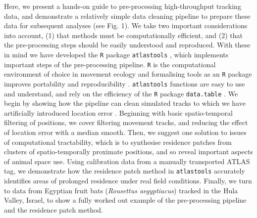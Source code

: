 \documentclass[10pt,paper=a4,headings=standardclasses
]{scrartcl}
\begin{document}
Here, we present a hands-on guide to pre-processing high-throughput tracking data, and demonstrate a relatively simple data cleaning pipeline to prepare these data for subsequent analyses (see Fig. 1). 
We take two important considerations into account, (1) that methods must be computationally efficient, and (2) that the pre-processing steps should be easily understood and reproduced.
With these in mind we have developed the \texttt{R} package \texttt{atlastools} \citep{gupte2020a, rcoreteam2020}, which implements important steps of the pre-processing pipeline.
\texttt{R} is the computational environment of choice in movement ecology \citep{joo2020} and formalising tools as an \texttt{R} package improves portability and reproducibility \citep{marwick2018}.
\texttt{atlastools} functions are easy to use and understand, and rely on the efficiency of the \texttt{R} package \texttt{data.table} \citep{dowle2020}.
We begin by showing how the pipeline can clean simulated tracks to which we have artificially introduced location error \citep{gurarie2017}.
Beginning with basic spatio-temporal filtering of positions, we cover filtering movement tracks, and reducing the effect of location error with a median smooth.
Then, we suggest one solution to issues of computational tractability, which is to synthesise residence patches \citep[\textit{sensu}][]{bijleveld2016, oudman2018, barraquand2008} from clusters of spatio-temporally proximate positions, and so reveal important aspects of animal space use.
Using calibration data from a manually transported ATLAS tag, we demonstrate how the residence patch method in \texttt{atlastools} accurately identifies areas of prolonged residence under real field conditions.
Finally, we turn to data from Egyptian fruit bats (\textit{Rousettus aegyptiacus}) tracked in the Hula Valley, Israel, to show a fully worked out example of the pre-processing pipeline and the residence patch method.
\end{document}
